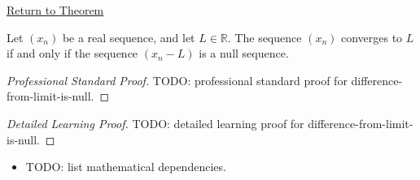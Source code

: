 \newpage
{}
\label{prf:difference-from-limit-is-null}

\begin{remark*}[Return]
\hyperref[thm:difference-from-limit-is-null]{Return to Theorem}
\end{remark*}

\begin{theorem*}
Let $(x_n)$ be a real sequence, and let $L \in \mathbb{R}$. The sequence
$(x_n)$ converges to $L$ if and only if the sequence $(x_n - L)$ is a null
sequence.

\smallskip
\noindent
\end{theorem*}

\begin{proof}[Professional Standard Proof]
\LRAProofBodyStart
TODO: professional standard proof for difference-from-limit-is-null.
\end{proof}

\begin{proof}[Detailed Learning Proof]
\LRAProofBodyStart
TODO: detailed learning proof for difference-from-limit-is-null.
\end{proof}

\begin{remark*}
\end{remark*}

\begin{dependencies}
\begin{itemize}
  \item TODO: list mathematical dependencies.
\end{itemize}
\end{dependencies}

\clearpage
